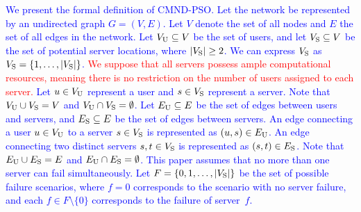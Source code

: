 \documentclass[10pt, letterpaper]{IEEEtran}
\newcommand\blue[1]{\textcolor{blue}{#1}}
\newcommand\red[1]{\textcolor{red}{#1}}
\begin{document}
\begin{CJK}{UTF8}{ipxm}
\blue{
We present the formal definition of CMND-PSO. Let the network be represented by an undirected graph $G = (V, E)$.
Let $V$ denote the set of all nodes and $E$ the set of all edges in the network.
Let $V_{\rm{U}} \subseteq V$ be the set of users, and let $V_{\rm{S}} \subseteq V$ be the set of potential server locations, where $|V_{\rm{S}}| \geq 2$.
We can express $V_{\rm{S}}$ as $V_{\rm{S}} = \{1, \ldots, |V_{\rm{S}}|\}$.
\red{We suppose that all servers possess ample computational resources, meaning there is no restriction on the number of users assigned to each server.}
Let $u \in V_{\rm{U}}$ represent a user and $s \in V_{\rm{S}}$ represent a server.
Note that $V_{\rm{U}} \cup V_{\rm{S}} = V$ and $V_{\rm{U}} \cap V_{\rm{S}} = \emptyset$.
Let $E_{\rm{U}} \subseteq E$ be the set of edges between users and servers, and $E_{\rm{S}} \subseteq E$ be the set of edges between servers.
An edge connecting a user $u \in V_{\rm{U}}$ to a server $s \in V_{\rm{S}}$ is represented as $(u,s) \in E_{\rm{U}}$.
An edge connecting two distinct servers $s, t \in V_{\rm{S}}$ is represented as $(s, t) \in E_{\rm{S}}$.
Note that  $E_{\rm U} \cup E_{\rm S} =E$ and $E_{\rm{U}} \cap E_{\rm{S}} = \emptyset$.
This paper assumes that no more than one server can fail simultaneously.
Let $F = \{0, 1, \ldots, |V_{\rm{S}}|\}$ be the set of possible failure scenarios, where $f = 0$ corresponds to the scenario with no server failure, and each $f \in F \setminus \{0\}$ corresponds to the failure of server~$f$.
}


\end{CJK}
\end{document}
